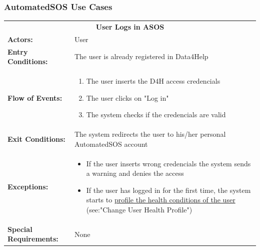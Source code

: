 {\color{Blue}\subsubsection{AutomatedSOS Use Cases}}

\begin{table}[H]
	\centering
	{\renewcommand{\arraystretch}{1.5}%
		\begin{tabular}{|@{\hspace{2em}} p{4cm} @{}| p{11cm} @{\qquad}|}
			\cline{1-2}
			\multicolumn{2}{|c|}{\textbf{User Logs in ASOS}} \\ \cline{1-2}
			\textbf{Actors:} & User \\ \cline{1-2}
			\textbf{Entry Conditions:} & The user is already registered in Data4Help \\ \cline{1-2}
			\textbf{Flow of Events:} & \begin{enumerate}[topsep=0em, itemsep=-0.2em]
				\item The user inserts the D4H access credencials
				\item The user clicks on "Log in"
				\item The system checks if the credencials are valid
			\end{enumerate}\\ \cline{1-2}
			\textbf{Exit Conditions:} & The system redirects the user to his/her personal AutomatedSOS account\\ \cline{1-2}
			\textbf{Exceptions:} & \begin{itemize}[topsep=0em, itemsep=-0.2em]
				\item If the user inserts wrong credencials the system sends a warning and denies the access
				\item If the user has logged in for the first time, the system starts to \underline{profile the health conditions of the user} (see:"Change User Health Profile")
			\end{itemize} \\ \cline{1-2}
			\textbf{Special Requirements:} & None \\ \cline{1-2}
	\end{tabular}} \quad
\end{table}

